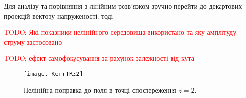 Для аналізу та порівняння з лінійним розв'язком зручно перейти до 
декартових проекцій вектору напруженості, тоді

%
%


\textcolor{red} {TODO: Які показники нелінійного середовища використано та яку амплітуду струму застосовано}

\textcolor{red} {TODO: ефект самофокусування за рахунок залежності від кута}

\begin{figure}[htbp] \begin{center}
\texttt{[image: KerrTRz2]}
\caption{Нелінійна поправка до поля в точці спостереження $ z = 2 $.} 
\label{fig:KerrTRz2}
\end{center} \end{figure}

